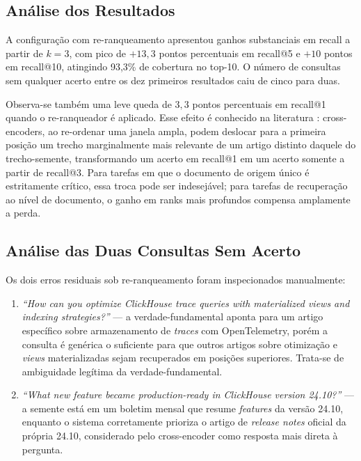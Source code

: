 \documentclass[11pt,a4paper]{article}
\begin{document}
\subsection{Análise dos Resultados}

A configuração com re-ranqueamento apresentou ganhos substanciais em recall a partir de $k=3$, com pico de $+13{,}3$ pontos percentuais em recall@5 e $+10$ pontos em recall@10, atingindo 93,3\% de cobertura no top-10. O número de consultas sem qualquer acerto entre os dez primeiros resultados caiu de cinco para duas.

Observa-se também uma leve queda de $3{,}3$ pontos percentuais em recall@1 quando o re-ranqueador é aplicado. Esse efeito é conhecido na literatura \cite{nogueira2019}: cross-encoders, ao re-ordenar uma janela ampla, podem deslocar para a primeira posição um trecho marginalmente mais relevante de um artigo distinto daquele do trecho-semente, transformando um acerto em recall@1 em um acerto somente a partir de recall@3. Para tarefas em que o documento de origem único é estritamente crítico, essa troca pode ser indesejável; para tarefas de recuperação ao nível de documento, o ganho em ranks mais profundos compensa amplamente a perda.

\subsection{Análise das Duas Consultas Sem Acerto}

Os dois erros residuais sob re-ranqueamento foram inspecionados manualmente:

\begin{enumerate}
  \item \textit{``How can you optimize ClickHouse trace queries with materialized views and indexing strategies?''} --- a verdade-fundamental aponta para um artigo específico sobre armazenamento de \textit{traces} com OpenTelemetry, porém a consulta é genérica o suficiente para que outros artigos sobre otimização e \textit{views} materializadas sejam recuperados em posições superiores. Trata-se de ambiguidade legítima da verdade-fundamental.
  \item \textit{``What new feature became production-ready in ClickHouse version 24.10?''} --- a semente está em um boletim mensal que resume \textit{features} da versão 24.10, enquanto o sistema corretamente prioriza o artigo de \textit{release notes} oficial da própria 24.10, considerado pelo cross-encoder como resposta mais direta à pergunta.
\end{enumerate}
\end{document}
